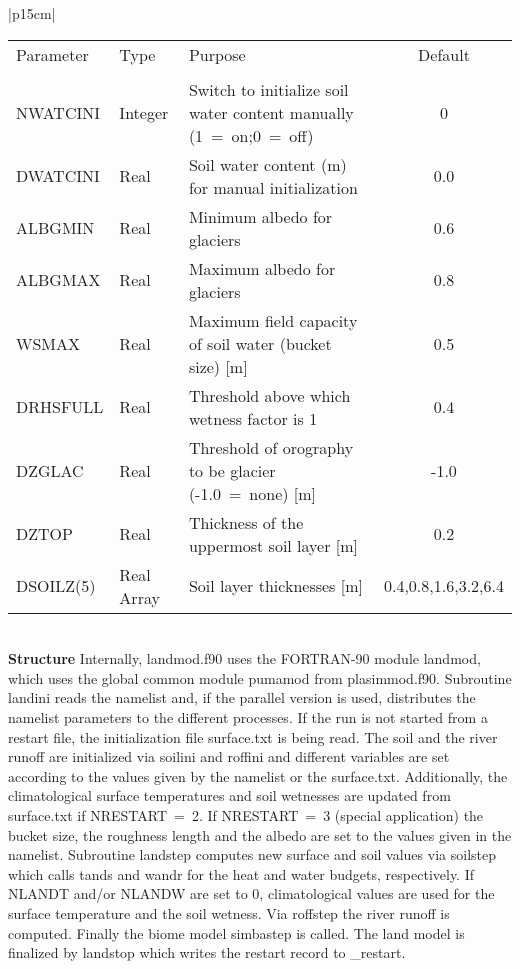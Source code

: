 \begin{center}
\begin{tabular}{|p{15cm}|}
\hline
\begin{center}
\begin{tabular}{l l p{5cm} c} %
Parameter & Type & Purpose & Default \\
&&&\\
NWATCINI & Integer& Switch to initialize soil water content manually (1~=~on;0~=~off) & 0 \\
DWATCINI & Real& Soil water content (m) for manual initialization & 0.0 \\
ALBGMIN & Real& Minimum albedo for glaciers & 0.6 \\
ALBGMAX & Real& Maximum albedo for glaciers & 0.8 \\
WSMAX & Real&  Maximum field capacity of soil water (bucket size) [m] & 0.5 \\
DRHSFULL & Real&  Threshold above which wetness factor is 1 & 0.4 \\
DZGLAC &Real&  Threshold of orography to be glacier (-1.0~=~none) [m] & -1.0 \\
DZTOP &Real& Thickness of the uppermost soil layer [m] & 0.2 \\
DSOILZ(5) & Real Array & Soil layer thicknesses [m] & 0.4,0.8,1.6,3.2,6.4\\
\end{tabular}
\end{center}
\vspace{3mm} \\
\hline
\vspace{2mm} {\bf Structure} Internally, {\module landmod.f90} uses the FORTRAN-90
module {\modu landmod}, which uses the global common module {\modu pumamod} from
{\module plasimmod.f90}. Subroutine {\sub landini} reads the namelist and, if the parallel
version is used,  distributes the namelist parameters to the different
processes. If the run is not started from a restart file,
the initialization file
{\file surface.txt} is being read. The soil and the river runoff are initialized via {\sub
soilini}
and {\sub roffini} and different variables are set according to the
values given by the namelist or the {\file surface.txt}.
Additionally, the climatological surface temperatures and soil
wetnesses are updated from {\file surface.txt} if NRESTART~=~2. If NRESTART~=~3
(special application) the bucket size, the roughness length and the albedo are set to the values
given in the namelist.  Subroutine {\sub landstep} computes new surface and soil values via
{\sub soilstep} which calls {\sub tands} and {\sub wandr} for the heat and water budgets,
respectively. If NLANDT and/or NLANDW are set to 0, climatological values are used for
the
surface temperature and the soil wetness. Via {\sub roffstep} the river runoff is computed.
Finally
the biome model {\sub simbastep} is called. The land model is finalized by {\sub landstop}
which writes the restart record to {\file \modir\_restart}. \vspace{3mm} \\
\hline
\end{tabular}
\end{center}
\newpage

